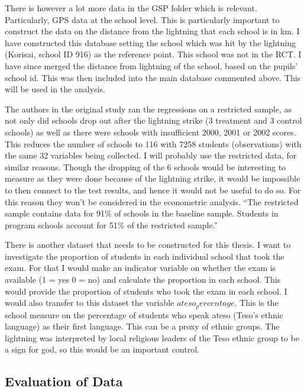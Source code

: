 \documentclass{article}
\begin{document}
There is however a lot more data in the GSP folder which is relevant. Particularly, GPS data at the school level. This is particularly important to construct the data on the distance from the lightning that each school is in km. I have constructed this database setting the school which was hit by the lightning (Korisai, school ID 916) as the reference point. This school was not in the RCT. I have since merged the distance from lightning of the school, based on the pupils' school id. This was then included into the main database commented above. This will be used in the analysis. 

The authors in the original study ran the regressions on a restricted sample, as not only did schools drop out after the lightning strike (3 treatment and 3 control schools) as well as there were schools with insufficient 2000, 2001 or 2002 scores. This reduces the number of schools to 116 with 7258 students (observations) with the same 32 variables being collected. I will probably use the restricted data, for similar reasons. Though the dropping of the 6 schools would be interesting to measure as they were done because of the lightning strike, it would be impossible to then connect to the test results, and hence it would not be useful to do so. For this reason they won't be considered in the econometric analysis. “The restricted sample contains data for 91\% of schools in the baseline sample. Students in program schools account for 51\% of the restricted sample.” \autocites{kremer-miguel-thornton-2009} 

There is another dataset that needs to be constructed for this thesis. I want to investigate the proportion of students in each individual school that took the exam. For that I would make an indicator variable on whether the exam is available (1 = yes 0 = no) and calculate the proportion in each school. This would provide the proportion of students who took the exam in each school. I would also transfer to this dataset the variable $ateso_percentage$. This is the school measure on the percentage of students who speak ateso (Teso's ethnic language) as their first language. This can be a proxy of ethnic groups. The lightning was interpreted by local religious leaders of the Teso ethnic group to be a sign for god, so this would be an important control. 

\subsection{Evaluation of Data}
\end{document}
